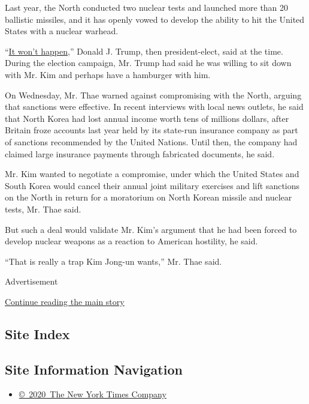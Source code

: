 Last year, the North conducted two nuclear tests and launched more than
20 ballistic missiles, and it has openly vowed to develop the ability to
hit the United States with a nuclear warhead.

``\href{https://www.nytimes3xbfgragh.onion/2017/01/02/world/asia/trump-twitter-north-korea-missiles-china.html}{It
won't happen},'' Donald J. Trump, then president-elect, said at the
time. During the election campaign, Mr. Trump had said he was willing to
sit down with Mr. Kim and perhaps have a hamburger with him.

On Wednesday, Mr. Thae warned against compromising with the North,
arguing that sanctions were effective. In recent interviews with local
news outlets, he said that North Korea had lost annual income worth tens
of millions dollars, after Britain froze accounts last year held by its
state-run insurance company as part of sanctions recommended by the
United Nations. Until then, the company had claimed large insurance
payments through fabricated documents, he said.

Mr. Kim wanted to negotiate a compromise, under which the United States
and South Korea would cancel their annual joint military exercises and
lift sanctions on the North in return for a moratorium on North Korean
missile and nuclear tests, Mr. Thae said.

But such a deal would validate Mr. Kim's argument that he had been
forced to develop nuclear weapons as a reaction to American hostility,
he said.

``That is really a trap Kim Jong-un wants,'' Mr. Thae said.

Advertisement

\protect\hyperlink{after-bottom}{Continue reading the main story}

\hypertarget{site-index}{%
\subsection{Site Index}\label{site-index}}

\hypertarget{site-information-navigation}{%
\subsection{Site Information
Navigation}\label{site-information-navigation}}

\begin{itemize}
\tightlist
\item
  \href{https://help.nytimes3xbfgragh.onion/hc/en-us/articles/115014792127-Copyright-notice}{©~2020~The
  New York Times Company}
\end{itemize}

